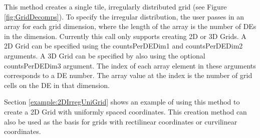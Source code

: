   
   This method creates a single tile, irregularly distributed grid
   (see Figure \ref{fig:GridDecomps}).
   To specify the irregular distribution, the user passes in an array
   for each grid dimension, where the length of the array is the number
   of DEs in the dimension.  Currently this call only
   supports creating 2D or 3D Grids. A 2D Grid can be specified using the
   countsPerDEDim1 and countsPerDEDim2 arguments.  A 3D Grid can
   be specified by also using the optional countsPerDEDim3 argument.
   The index of each array element in these arguments corresponds to
   a DE number.  The array value at the index is the number of grid
   cells on the DE in that dimension.
  
   Section \ref{example:2DIrregUniGrid} shows an example
   of using this method to create a 2D Grid with uniformly spaced
   coordinates.  This creation method can also be used as the basis for
   grids with rectilinear coordinates or curvilinear coordinates.
  
